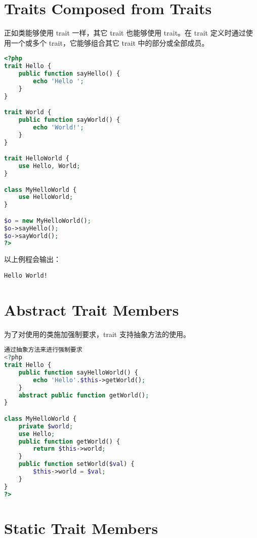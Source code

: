 \section{Traits Composed from Traits}

正如类能够使用 trait 一样，其它 trait 也能够使用 trait。在 trait 定义时通过使用一个或多个 trait，它能够组合其它 trait 中的部分或全部成员。

\begin{lstlisting}[language=PHP]
<?php
trait Hello {
    public function sayHello() {
        echo 'Hello ';
    }
}

trait World {
    public function sayWorld() {
        echo 'World!';
    }
}

trait HelloWorld {
    use Hello, World;
}

class MyHelloWorld {
    use HelloWorld;
}

$o = new MyHelloWorld();
$o->sayHello();
$o->sayWorld();
?>
\end{lstlisting}

以上例程会输出：

\begin{verbatim}
Hello World!
\end{verbatim}




\section{Abstract Trait Members}



为了对使用的类施加强制要求，trait 支持抽象方法的使用。



\begin{lstlisting}[language=PHP]
通过抽象方法来进行强制要求
<?php
trait Hello {
    public function sayHelloWorld() {
        echo 'Hello'.$this->getWorld();
    }
    abstract public function getWorld();
}

class MyHelloWorld {
    private $world;
    use Hello;
    public function getWorld() {
        return $this->world;
    }
    public function setWorld($val) {
        $this->world = $val;
    }
}
?>
\end{lstlisting}






\section{Static Trait Members}

